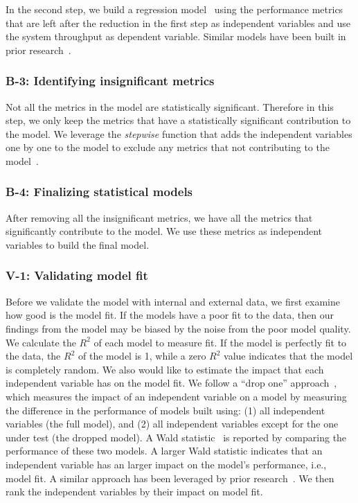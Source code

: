 In the second step, we build a regression model~\cite{freedman2009statistical} using the performance metrics that are left after the reduction in the first step as independent variables and use the system throughput as dependent variable. Similar models have been built in prior research~\cite{Cohen:2005:CIC:1095810.1095821,xiong2013vperfguard}.

\subsubsection{B-3: Identifying insignificant metrics}
Not all the metrics in the model are statistically significant. Therefore in this step, we only keep the metrics that have a statistically significant contribution to the model. We leverage the \textit{stepwise} function that adds the independent variables one by one to the model to exclude any metrics that not contributing to the model~\cite{RInAction}. 

\subsubsection{B-4: Finalizing statistical models}
After removing all the insignificant metrics, we have all the metrics that significantly contribute to the model. We use these metrics as independent variables to build the final model.

\subsubsection{V-1: Validating model fit}

Before we validate the model with internal and external data, we first examine how good is the model fit. If the models have a poor fit to the data, then our findings from the model may be biased by the noise from the poor model quality. We calculate the $R^2$ of each model to measure fit. If the model is perfectly fit to the data, the $R^2$ of the model is 1, while a zero $R^2$ value indicates that the model is completely random. We also would like to estimate the impact that each independent variable has on the model fit. We follow a ``drop one'' approach~\cite{Chambers1990}, which measures the impact of an independent variable on a model by measuring the difference in the performance of models built using: (1) all independent variables (the full model), and (2) all independent variables except for the one under test (the dropped model). A Wald statistic~\cite{harrell2015regression} is reported by comparing the performance of these two models. A larger Wald statistic indicates that an independent variable has an larger impact on the model's performance, i.e., model fit. A similar approach has been leveraged by prior research~\cite{mcintosh2015emse}. We then rank the independent variables by their impact on model fit. 


